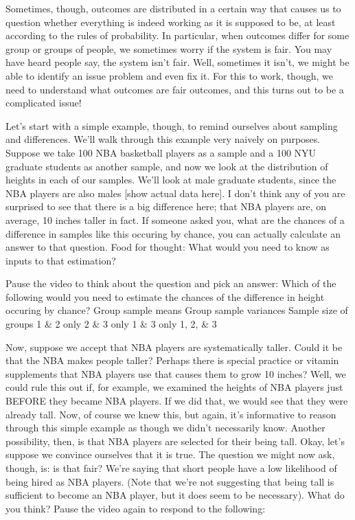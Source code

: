 \documentclass[]{book}
\begin{document}
Sometimes, though, outcomes are distributed in a certain way that causes us to question whether everything is indeed working as it is supposed to be, at least according to the rules of probability. In particular, when outcomes differ for some group or groups of people, we sometimes worry if the system is fair. You may have heard people say, the system isn't fair.
Well, sometimes it isn't, we might be able to identify an issue problem and even fix it. For this to work, though, we need to understand what outcomes are fair outcomes, and this turns out to be a complicated issue!

Let's start with a simple example, though, to remind ourselves about sampling and differences. We'll walk through this example very naively on purposes. Suppose we take 100 NBA basketball players as a sample and a 100 NYU graduate students as another sample, and now we look at the distribution of heights in each of our samples. We'll look at male graduate students, since the NBA players are also males {[}show actual data here{]}. I don't think any of you are surprised to see that there is a big difference here; that NBA players are, on average, 10 inches taller in fact. If someone asked you, what are the chances of a difference in samples like this occuring by chance, you can actually calculate an answer to that question. Food for thought: What would you need to know as inputs to that estimation?

Pause the video to think about the question and pick an answer:
Which of the following would you need to estimate the chances of the difference in height occuring by chance?
Group sample means
Group sample variances
Sample size of groups
1 \& 2 only
2 \& 3 only
1 \& 3 only
1, 2, \& 3

Now, suppose we accept that NBA players are systematically taller. Could it be that the NBA makes people taller? Perhaps there is special practice or vitamin supplements that NBA players use that causes them to grow 10 inches? Well, we could rule this out if, for example, we examined the heights of NBA players just BEFORE they became NBA players. If we did that, we would see that they were already tall. Now, of course we knew this, but again, it's informative to reason through this simple example as though we didn't necessarily know. Another possibility, then, is that NBA players are selected for their being tall. Okay, let's suppose we convince ourselves that it is true. The question we might now ask, though, is: is that fair? We're saying that short people have a low likelihood of being hired as NBA players. (Note that we're not suggesting that being tall is sufficient to become an NBA player, but it does seem to be necessary). What do you think? Pause the video again to respond to the following:
\end{document}
